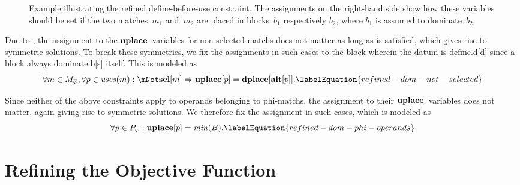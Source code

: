 \begin{figure}
  \centering%

  \caption[Example illustrating the refined define-before-use constraint]%
          {%
            Example illustrating the refined define-before-use constraint.
            The assignments on the right-hand side show how these
            variables should be set if the two matches~$m_1$ and~$m_2$ are
            placed in blocks~$b_1$ respectively $b_2$, where $b_1$ is assumed to
            dominate~$b_2$%
          }
\end{figure}

Due to , the assignment to the
$\mVar{uplace}$~\glspl{variable} for non-selected \glspl{match} does not matter
as long as  is satisfied, which gives rise to symmetric
\glspl{solution}.
%
To break these symmetries, we fix the assignments in such cases to the
\gls{block} wherein the \gls{datum} is \gls{define.d}[d] since a \gls{block}
always \gls{dominate.b}[s] itself.
%
This is modeled as
%
\begin{equation}
  \forall m \in \mPhiMatchCompSet,
  \forall p \in \mUses(m) :
  \mNot\mVar{sel}[m] \mImp \mVar{uplace}[p] = \mVar{dplace}[\mVar{alt}[p]].
  \labelEquation{refined-dom-not-selected}
\end{equation}

Since neither of the above \glspl{constraint} apply to \glspl{operand} belonging
to \glspl{phi-match}, the assignment to their $\mVar{uplace}$~\glspl{variable}
does not matter, again giving rise to symmetric \glspl{solution}.
%
We therefore fix the assignment in such cases, which is modeled as
%
\begin{equation}
  \forall p \in \mPhiOperandSet :
  \mVar{uplace}[p] = \mMin(\mBlockSet).
  \labelEquation{refined-dom-phi-operands}
\end{equation}


\section{Refining the Objective Function}

